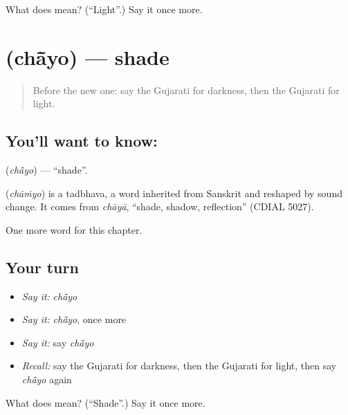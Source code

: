 \begin{tcolorbox}[breakable,colback=teal!4,colframe=teal!35!black,title={Before you move on}]
What does  mean? (\textquotedblleft{}Light\textquotedblright{}.) Say it once more.
\end{tcolorbox}
\section[\texorpdfstring{\gu{છાંયો} (chā̃yo)}{છાંયો (chā̃yo)}]{ (chā̃yo) — shade}

\label{lesson:GU-C121-chayo}



\begin{quote}
Before the new one: say the Gujarati for darkness, then the Gujarati for light.
\end{quote}

\subsection*{You'll want to know: }
\textbf{} (\emph{chā̃yo}) — \textquotedblleft{}shade\textquotedblright{}.

\begin{cousinweb}
\textbf{} (\emph{chāṁyo}) is a tadbhava, a word inherited from Sanskrit and reshaped by sound change. It comes from \emph{chāyā}, \textquotedblleft{}shade, shadow, reflection\textquotedblright{} (CDIAL 5027).
\end{cousinweb}

\begin{grammarlens}[title={What you've built}]
One more word for this chapter.
\end{grammarlens}

\subsection*{Your turn}
\begin{itemize}
\raggedright
  \item \emph{Say it:} \emph{chā̃yo}
  \item \emph{Say it:} \emph{chā̃yo}, once more
  \item \emph{Say it:} say \emph{chā̃yo}
  \item \emph{Recall:} say the Gujarati for darkness, then the Gujarati for light, then say \emph{chā̃yo} again
\end{itemize}

\begin{tcolorbox}[breakable,colback=teal!4,colframe=teal!35!black,title={Before you move on}]
What does  mean? (\textquotedblleft{}Shade\textquotedblright{}.) Say it once more.
\end{tcolorbox}
